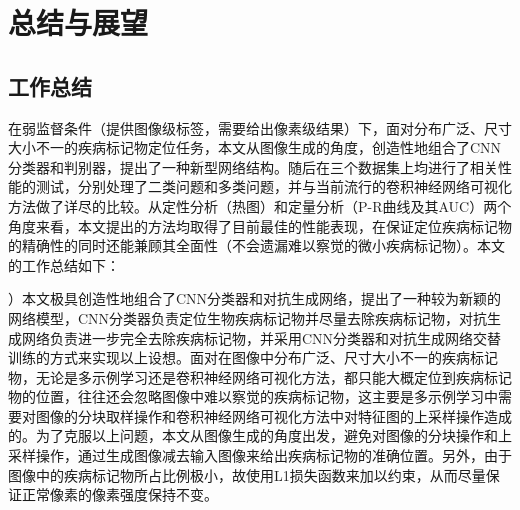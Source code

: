 \chapter{总结与展望}
\section{工作总结}

在弱监督条件（提供图像级标签，需要给出像素级结果）下，面对分布广泛、尺寸大小不一的疾病标记物定位任务，本文从图像生成的角度，创造性地组合了CNN分类器和判别器，提出了一种新型网络结构。随后在三个数据集上均进行了相关性能的测试，分别处理了二类问题和多类问题，并与当前流行的卷积神经网络可视化方法做了详尽的比较。从定性分析（热图）和定量分析（P-R曲线及其AUC）两个角度来看，本文提出的方法均取得了目前最佳的性能表现，在保证定位疾病标记物的精确性的同时还能兼顾其全面性（不会遗漏难以察觉的微小疾病标记物）。本文的工作总结如下：

）本文极具创造性地组合了CNN分类器和对抗生成网络，提出了一种较为新颖的网络模型，CNN分类器负责定位生物疾病标记物并尽量去除疾病标记物，对抗生成网络负责进一步完全去除疾病标记物，并采用CNN分类器和对抗生成网络交替训练的方式来实现以上设想。面对在图像中分布广泛、尺寸大小不一的疾病标记物，无论是多示例学习还是卷积神经网络可视化方法，都只能大概定位到疾病标记物的位置，往往还会忽略图像中难以察觉的疾病标记物，这主要是多示例学习中需要对图像的分块取样操作和卷积神经网络可视化方法中对特征图的上采样操作造成的。为了克服以上问题，本文从图像生成的角度出发，避免对图像的分块操作和上采样操作，通过生成图像减去输入图像来给出疾病标记物的准确位置。另外，由于图像中的疾病标记物所占比例极小，故使用L1损失函数来加以约束，从而尽量保证正常像素的像素强度保持不变。

